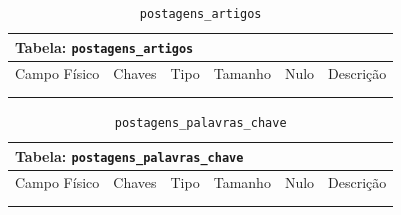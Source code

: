 \documentclass[12pt,a4paper]{article}
\begin{document}
\begin{center}
\begin{table}[h!]
	\caption{\texttt{postagens\_artigos}}
	\label{tabela:postagensArtigos}
	\begin{tabular}{|p{2.3cm}|p{1.2cm}|p{1.8cm}|p{1.5cm}|p{1cm}|p{6cm}|}\hline	
		\multicolumn{6}{|p{16cm}|}{\cellcolor{cinzaClaro}  \centering Tabela: \texttt{postagens\_artigos}} \\ \hline %
		{\small Campo Físico}   & {\small Chaves} & {\small Tipo} & {\small Tamanho} & {\small Nulo} & {\small Descrição}\\\hline %
		
		{\tiny } & {\tiny } & {\tiny } & {\tiny } & {\tiny } &{\tiny }\\\hline
		{\tiny } & {\tiny } & {\tiny } & {\tiny } & {\tiny } &{\tiny }\\\hline
		
			
	\end{tabular}
\end{table}	
\end{center}


\begin{center}
\begin{table}[h!]
	\caption{\texttt{postagens\_palavras\_chave}}
	\label{tabela:postagensPalavrasChave}
	\begin{tabular}{|p{2.3cm}|p{1.2cm}|p{1.8cm}|p{1.5cm}|p{1cm}|p{6cm}|}\hline	
		\multicolumn{6}{|p{16cm}|}{\cellcolor{cinzaClaro}  \centering Tabela: \texttt{postagens\_palavras\_chave}} \\ \hline %
		{\small Campo Físico}   & {\small Chaves} & {\small Tipo} & {\small Tamanho} & {\small Nulo} & {\small Descrição}\\\hline %
		
		{\tiny } & {\tiny } & {\tiny } & {\tiny } & {\tiny } &{\tiny }\\\hline
		{\tiny } & {\tiny } & {\tiny } & {\tiny } & {\tiny } &{\tiny }\\\hline
			
	\end{tabular}
\end{table}	
\end{center}
\end{document}
